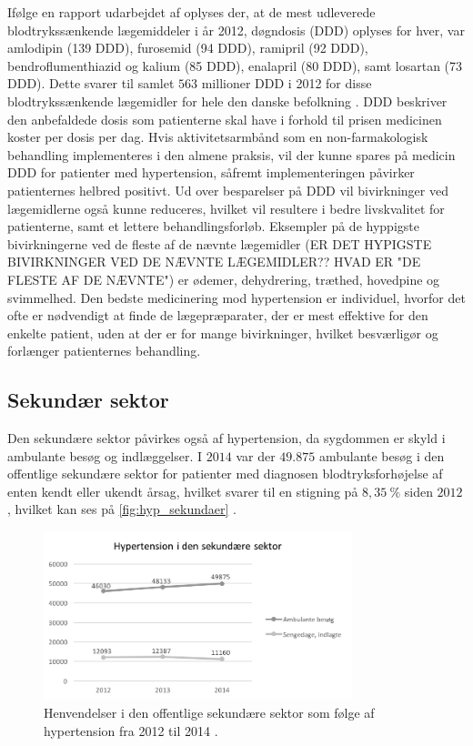 Ifølge en rapport udarbejdet af \citeauthor{apotekerforeningen2012} oplyses der, at de mest udleverede blodtrykssænkende lægemiddeler i år 2012, døgndosis (DDD) oplyses for hver, var amlodipin (139 DDD), furosemid (94 DDD), ramipril (92 DDD), bendroflumenthiazid og kalium (85 DDD), enalapril (80 DDD), samt losartan (73 DDD). Dette svarer til samlet $563$ millioner DDD i 2012 for disse blodtrykssænkende lægemidler for hele den danske befolkning \citep{apotekerforeningen2012}. DDD beskriver den anbefaldede dosis som patienterne skal have i forhold til prisen medicinen koster per dosis per dag. Hvis aktivitetsarmbånd som en non-farmakologisk  behandling implementeres i den almene praksis, vil der kunne spares på medicin DDD for patienter med hypertension, såfremt implementeringen påvirker patienternes helbred positivt. Ud over besparelser på DDD vil bivirkninger ved lægemidlerne også kunne reduceres, hvilket vil resultere i bedre livskvalitet for patienterne, samt et lettere behandlingsforløb. Eksempler på de hyppigste bivirkningerne ved de fleste af de nævnte lægemidler (ER DET HYPIGSTE BIVIRKNINGER VED DE NÆVNTE LÆGEMIDLER?? HVAD ER "DE FLESTE AF DE NÆVNTE") er ødemer, dehydrering, træthed, hovedpine og svimmelhed. Den bedste medicinering mod hypertension er individuel, hvorfor det ofte er nødvendigt at finde de lægepræparater, der er mest effektive for den enkelte patient, uden at der er for mange bivirkninger, hvilket besværligør og forlænger patienternes behandling.

\subsection{Sekundær sektor}
Den sekundære sektor påvirkes også af hypertension, da sygdommen er skyld i ambulante besøg og indlæggelser. I $2014$ var der $49.875$ ambulante besøg i den offentlige sekundære sektor for patienter med diagnosen blodtryksforhøjelse af enten kendt eller ukendt årsag, hvilket svarer til en stigning på $8,35~\%$ siden $2012$, hvilket kan ses på \autoref{fig:hyp_sekundaer} \citep{sundhedsdatastyrelsen2016}. 

\begin{figure}[H]
\centering
\includegraphics[width=0.8\textwidth]{figures/hyp_sekundaer}
\caption{Henvendelser i den offentlige sekundære sektor som følge af hypertension fra 2012 til 2014 \citep{sundhedsdatastyrelsen2016}.}
\label{fig:hyp_sekundaer}
\end{figure}

